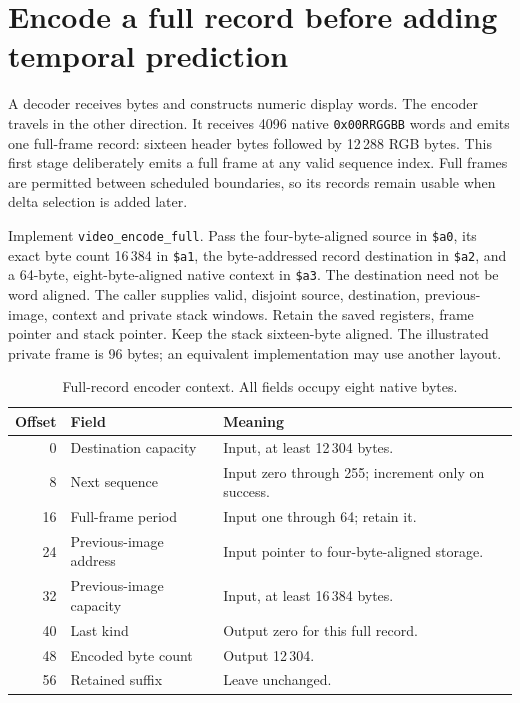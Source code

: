 \section{Encode a full record before adding temporal prediction}
A decoder receives bytes and constructs numeric display words. The encoder travels
in the other direction. It receives 4096 native \texttt{0x00RRGGBB} words and emits
one full-frame record: sixteen header bytes followed by 12\,288 RGB bytes. This
first stage deliberately emits a full frame at any valid sequence index. Full
frames are permitted between scheduled boundaries, so its records remain usable
when delta selection is added later.

Implement \texttt{video\_encode\_full}. Pass the four-byte-aligned source in
\texttt{\$a0}, its exact byte count 16\,384 in \texttt{\$a1}, the byte-addressed
record destination in \texttt{\$a2}, and a 64-byte, eight-byte-aligned native
context in \texttt{\$a3}. The destination need not be word aligned. The caller
supplies valid, disjoint source, destination, previous-image, context and private
stack windows. Retain the saved registers, frame pointer and stack pointer. Keep
the stack sixteen-byte aligned. The illustrated private frame is 96 bytes; an
equivalent implementation may use another layout.

\begin{table}[htbp]
  \centering
  \caption{Full-record encoder context. All fields occupy eight native bytes.}
  \label{tab:video-full-encode-context}
  \begin{tabular}{r p{1.6in} p{2.7in}}
    \toprule
    Offset & Field                   & Meaning                                            \\
    \midrule
    0      & Destination capacity    & Input, at least 12\,304 bytes.                     \\
    8      & Next sequence           & Input zero through 255; increment only on success. \\
    16     & Full-frame period       & Input one through 64; retain it.                   \\
    24     & Previous-image address  & Input pointer to four-byte-aligned storage.        \\
    32     & Previous-image capacity & Input, at least 16\,384 bytes.                     \\
    40     & Last kind               & Output zero for this full record.                  \\
    48     & Encoded byte count      & Output 12\,304.                                    \\
    56     & Retained suffix         & Leave unchanged.                                   \\
    \bottomrule
  \end{tabular}
\end{table}

